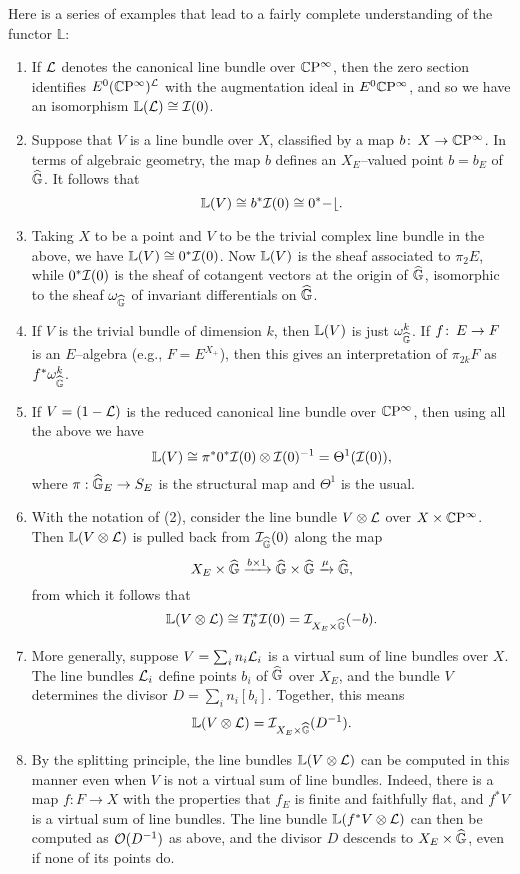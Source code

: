 Here is a series of examples that lead to a fairly complete understanding of the functor $\mathbb L$:
\begin{enumerate}
\item If $\mathcal{L}$ denotes the canonical line bundle over $\mathbb{C}\mathrm P^\infty$, then the zero section identifies $E^0 (\mathbb{C}\mathrm P^\infty)^{\mathcal{L}}$ with the augmentation ideal in $E^0 \mathbb{C}\mathrm P^\infty$, and so we have an isomorphism $\mathbb{L}(\mathcal{L}) \cong \mathcal{I}(0)$.
\item Suppose that $V$ is a line bundle over $X$, classified by a map $b \colon\thinspace X \to \mathbb{C}\mathrm P^\infty$.  In terms of algebraic geometry, the map $b$ defines an $X_E$--valued point $b = b_E$ of $\widehat{\mathbb G}$.  It follows that \[\mathbb{L}(V) \cong b^* \mathcal{I}(0) \cong 0^* \mathcal{-b}.\]
\item Taking $X$ to be a point and $V$ to be the trivial complex line bundle in the above, we have $\mathbb{L}(V) \cong 0^* \mathcal{I}(0)$.  Now $\mathbb{L}(V)$ is the sheaf associated to $\pi_2 E$, while $0^* \mathcal{I}(0)$ is the sheaf of cotangent vectors at the origin of $\widehat{\mathbb G}$, isomorphic to the sheaf $\omega_{\widehat{\mathbb G}}$ of invariant differentials on $\widehat{\mathbb G}$.
\item If $V$ is the trivial bundle of dimension $k$, then $\mathbb{L}(V)$ is just $\omega_{\widehat{\mathbb G}}^k$.  If $f \colon\thinspace E \to F$ is an $E$--algebra (e.g., $F = E^{X_+}$), then this gives an interpretation of $\pi_{2k} F$ as $f^* \omega_{\widehat{\mathbb G}}^k$.
\item If $V = (1 - \mathcal{L})$ is the reduced canonical line bundle over $\mathbb{C}\mathrm P^\infty$, then using all the above we have \[\mathbb{L}(V) \cong \pi^* 0^* \mathcal{I} (0) \otimes \mathcal{I}(0)^{-1} = \Theta^1(\mathcal{I}(0)),\] where $\pi: \widehat{\mathbb G}_E \to S_E$ is the structural map and $\Theta^1$ is the usual.
\item With the notation of (2), consider the line bundle $V \otimes \mathcal{L}$ over $X \times \mathbb{C}\mathrm P^\infty$.  Then $\mathbb{L}(V \otimes \mathcal{L})$ is pulled back from $\mathcal{I}_{\widehat{\mathbb G}} (0)$ along the map \[X_E \times \widehat{\mathbb G} \xrightarrow{b \times 1} \widehat{\mathbb G} \times \widehat{\mathbb G} \xrightarrow{\mu} \widehat{\mathbb G},\] from which it follows that \[\mathbb{L}(V \otimes \mathcal{L}) \cong T_b^* \mathcal{I}(0) = \mathcal{I}_{X_E \times \widehat{\mathbb G}}(-b).\]
\item More generally, suppose $V = \sum_i n_i \mathcal{L}_i$ is a virtual sum of line bundles over $X$.  The line bundles $\mathcal{L}_i$ define points $b_i$ of $\widehat{\mathbb G}$ over $X_E$, and the bundle $V$ determines the divisor $D = \sum_i n_i [b_i]$.  Together, this means \[\mathbb{L}(V \otimes \mathcal{L}) = \mathcal{I}_{X_E \times \widehat{\mathbb G}}(D^{-1}).\]
\item By the splitting principle, the line bundles $\mathbb{L}(V \otimes \mathcal{L})$ can be computed in this manner even when $V$ is not a virtual sum of line bundles.  Indeed, there is a map $f: F \to X$ with the properties that $f_E$ is finite and faithfully flat, and $f^* V$ is a virtual sum of line bundles.  The line bundle $\mathbb{L}(f^* V \otimes \mathcal{L})$ can then be computed as $\mathcal{O}(D^{-1})$ as above, and the divisor $D$ descends to $X_E \times \widehat{\mathbb G}$, even if none of its points do.

\end{enumerate}
